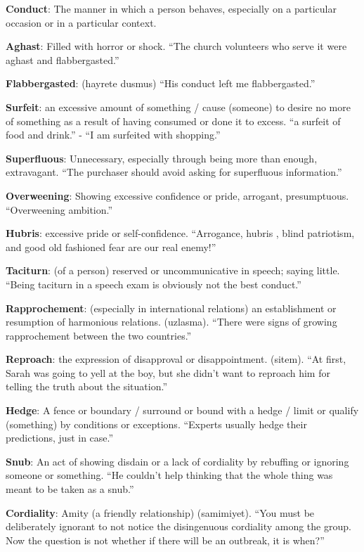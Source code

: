 \documentclass[12pt, a4paper]{ximera}
\begin{document}
\textbf{Conduct}: The manner in which a person behaves, especially on a particular occasion or in a particular context.

\textbf{Aghast}: Filled with horror or shock. ``The church volunteers who serve it were aghast and flabbergasted.''

\textbf{Flabbergasted}: (hayrete dusmus) ``His conduct left me flabbergasted.''

\textbf{Surfeit}: an excessive amount of something / cause (someone) to desire no more of something as a result of having consumed or done it to excess. ``a surfeit of food and drink.'' - ``I am surfeited with shopping.''

\textbf{Superfluous}: Unnecessary, especially through being more than enough, extravagant. ``The purchaser should avoid asking for superfluous information.''

\textbf{Overweening}: Showing excessive confidence or pride, arrogant, presumptuous. ``Overweening ambition.''

\textbf{Hubris}: excessive pride or self-confidence. ``Arrogance, hubris , blind patriotism, and good old fashioned fear are our real enemy!''

\textbf{Taciturn}: (of a person) reserved or uncommunicative in speech; saying little. ``Being taciturn in a speech exam is obviously not the best conduct.''

\textbf{Rapprochement}: (especially in international relations) an establishment or resumption of harmonious relations. (uzlasma). ``There were signs of growing rapprochement between the two countries.''

\textbf{Reproach}: the expression of disapproval or disappointment. (sitem). ``At first, Sarah was going to yell at the boy, but she didn't want to reproach him for telling the truth about the situation.''

\textbf{Hedge}: A fence or boundary / surround or bound with a hedge / limit or qualify (something) by conditions or exceptions. ``Experts usually hedge their predictions, just in case.''

\textbf{Snub}: An act of showing disdain or a lack of cordiality by rebuffing or ignoring someone or something. ``He couldn't help thinking that the whole thing was meant to be taken as a snub.''

\textbf{Cordiality}: Amity (a friendly relationship) (samimiyet). ``You must be deliberately ignorant to not notice the disingenuous cordiality among the group. Now the question is not whether if there will be an outbreak, it is when?''
\end{document}
